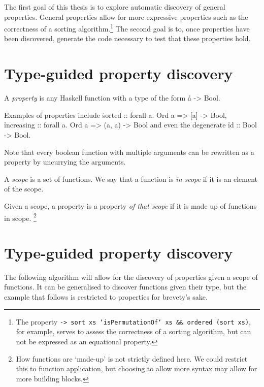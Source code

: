 \documentclass[a4paper, 11pt]{article}
\begin{document}
The first goal of this thesis is to explore automatic discovery of general properties.
General properties allow for more expressive properties such as the correctness of a sorting algorithm.\footnote{The property \texttt{\xs -> sort xs `isPermutationOf` xs && ordered (sort xs)}, for example, serves to assess the correctness of a sorting algorithm, but can not be expressed as an equational property.}
The second goal is to, once properties have been discovered, generate the code necessary to test that these properties hold.


\section{Type-guided property discovery}

\begin{de}
  A \emph{property} is any Haskell function with a type of the form \h{a -> Bool}.
\end{de}

\begin{ex}
  Examples of properties include \h{sorted :: forall a. Ord a => [a] -> Bool}, \h{increasing :: forall a. Ord a => (a, a) -> Bool} and even the degenerate \h{id :: Bool -> Bool}.

  Note that every boolean function with multiple arguments can be rewritten as a property by uncurrying the arguments.
\end{ex}

\begin{de}
  A \emph{scope} is a set of functions.
  We say that a function is \emph{in scope} if it is an element of the scope.
\end{de}

\begin{de}
  Given a scope, a property is a property \emph{of that scope} if it is made up of functions in scope.
  \footnote{How functions are `made-up' is not strictly defined here. We could restrict this to function application, but choosing to allow more syntax may allow for more building blocks.}
\end{de}


\section{Type-guided property discovery}

The following algorithm will allow for the discovery of properties given a scope of functions.
It can be generalised to discover functions given their type, but the example that follows is restricted to properties for brevety's sake.
\end{document}
